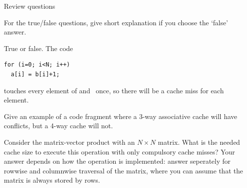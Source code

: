 \begin{notlulu}
 {Review questions}

For the true/false questions, give short explanation if you choose the `false' answer.

\begin{exercise}
  True or false. The code
\begin{verbatim}
for (i=0; i<N; i++)
  a[i] = b[i]+1;
\end{verbatim}
touches every element of  and~ once, so there will be a cache miss
for each element.
\end{exercise}

\begin{exercise}
  Give an example of a code fragment where a 3-way associative cache will
  have conflicts, but a 4-way cache will not.
\end{exercise}

\begin{exercise}
  Consider the matrix-vector product with an $N\times N$ matrix.
  What is the needed cache size to execute this operation with only
  compulsory cache misses? Your answer depends on how the operation
  is implemented: answer seperately for rowwise and columnwise traversal
  of the matrix, where you can assume that the matrix is always stored by rows.
\end{exercise}
\end{notlulu}

\endinput

\begin{exercise}
  Consider the matrix-vector product operation $y\leftarrow
  Ax$\footnote {The Blas operation for the matrix vector product
    computes $y\leftarrow Ax+y$. The difference in the code involved
    is minimal}:
\begin{verbatim}
for (i<M) {
  s = 0
  for (j<N) {
    s = s + a[i][j] * x[j]; }
  y[i] = s
}
\end{verbatim}
  Can you think of at least one reason why the case $M<N$ would be
  more efficient than $M>N$?
\end{exercise}

exercises:
diagonal format through CRS, why less efficient?

futility of unrolling for memory-bound ops

does manual unrolling help?

Chip power:
\[ P=C_TV_{dd}^2f\gamma \]
where $C_T$ is the effective chip capacitance, $V_{dd}$~is the supply
voltage, $f$~the clock frequency, and $\gamma$~the probability that a
0--1 transition occurs.
Increasing the number of cores increases $C_T$: linear effect.

\[ P=C_TV_{dd}^2f+V_{dd}I_{st}+V_{dd}I_{leak} \]
